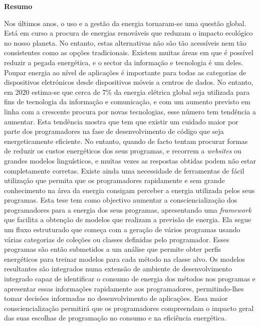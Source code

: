 \vspace*{2cm}
\begin{center}
\Large \bf Resumo
\end{center}
\vspace*{1cm} \setlength{\baselineskip}{0.6cm}

Nos últimos anos, o uso e a gestão da energia tornaram-se uma questão global. Está em curso a procura de energias renováveis que reduzam o impacto ecológico no nosso planeta. No entanto, estas alternativas não são tão acessíveis nem tão consistentes como as opções tradicionais. Existem muitas áreas em que é possível reduzir a pegada energética, e o sector da informação e tecnologia é um deles.
Poupar energia ao nível de aplicações é importante para todas as categorias de dispositivos eletrónicos desde dispositivos móveis a centros de dados. No entanto, em 2020 estima-se que cerca de 7\% da energia elétrica global seja utilizada para fins de tecnologia da informação e comunicação, e com um aumento previsto em linha com a crescente procura por novas tecnologias, esse número tem tendência a aumentar.
Esta tendência mostra que tem que existir um cuidado maior por parte dos programadores na fase de desenvolvimento de código que seja energeticamente eficiente. No entanto, quando de facto tentam procurar formas de reduzir os custos energéticos dos seus programas, e recorrem a \textit{websites} ou grandes modelos linguísticos, e muitas vezes as respostas obtidas podem não estar completamente corretas. Existe ainda uma necessidade de ferramentas de fácil utilização que permita que os programadores rapidamente e sem grande conhecimento na área da energia consigam perceber a energia utilizada pelos seus programas.
Esta tese tem como objectivo aumentar a consciencialização dos programadores para a energia dos seus programas, apresentando uma \textit{framework} que facilita a obtenção de modelos que realizam a previsão de energia. Ela segue um fluxo estruturado que começa com a geração de vários programas usando várias categorias de coleções ou classes definidas pelo programador. Esses programas são então submetidos a um análise que permite obter perfis energéticos para treinar modelos para cada método na classe alvo.
Os modelos resultantes são integrados numa extensão de ambiente de desenvolvimento integrado capaz de identificar o consumo de energia dos métodos nos programas e apresentar essas informações rapidamente aos programadores, permitindo-lhes tomar decisões informadas no desenvolvimento de aplicações.
Essa maior consciencialização permitirá que os programadores compreendam o impacto geral das suas escolhas de programação no consumo e na eficiência energética.
